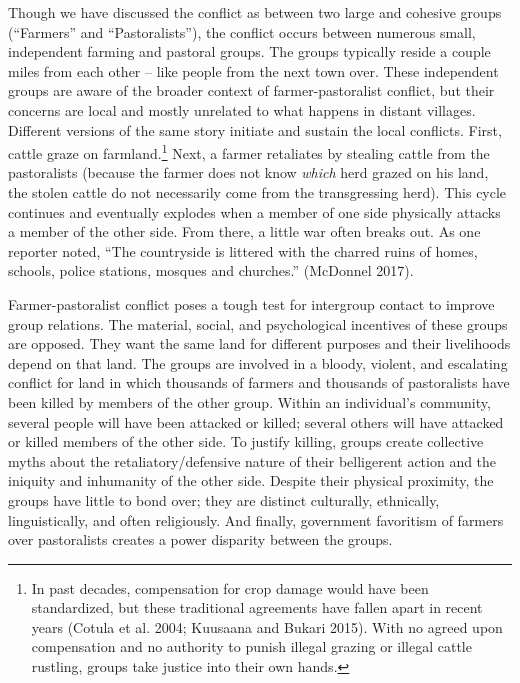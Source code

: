 \documentclass[11pt]{article}
\begin{document}
Though we have discussed the conflict as between two large and cohesive
groups (``Farmers'' and ``Pastoralists''), the conflict occurs between
numerous small, independent farming and pastoral groups. The groups
typically reside a couple miles from each other -- like people from the
next town over. These independent groups are aware of the broader
context of farmer-pastoralist conflict, but their concerns are local and
mostly unrelated to what happens in distant villages. Different versions
of the same story initiate and sustain the local conflicts. First,
cattle graze on farmland.\footnote{In past decades, compensation for
  crop damage would have been standardized, but these traditional
  agreements have fallen apart in recent years (Cotula et al. 2004;
  Kuusaana and Bukari 2015). With no agreed upon compensation and no
  authority to punish illegal grazing or illegal cattle rustling, groups
  take justice into their own hands.} Next, a farmer retaliates by
stealing cattle from the pastoralists (because the farmer does not know
\emph{which} herd grazed on his land, the stolen cattle do not
necessarily come from the transgressing herd). This cycle continues and
eventually explodes when a member of one side physically attacks a
member of the other side. From there, a little war often breaks out. As
one reporter noted, ``The countryside is littered with the charred ruins
of homes, schools, police stations, mosques and churches.'' (McDonnel
2017).

Farmer-pastoralist conflict poses a tough test for intergroup contact to
improve group relations. The material, social, and psychological
incentives of these groups are opposed. They want the same land for
different purposes and their livelihoods depend on that land. The groups
are involved in a bloody, violent, and escalating conflict for land in
which thousands of farmers and thousands of pastoralists have been
killed by members of the other group. Within an individual's community,
several people will have been attacked or killed; several others will
have attacked or killed members of the other side. To justify killing,
groups create collective myths about the retaliatory/defensive nature of
their belligerent action and the iniquity and inhumanity of the other
side. Despite their physical proximity, the groups have little to bond
over; they are distinct culturally, ethnically, linguistically, and
often religiously. And finally, government favoritism of farmers over
pastoralists creates a power disparity between the groups.
\end{document}

